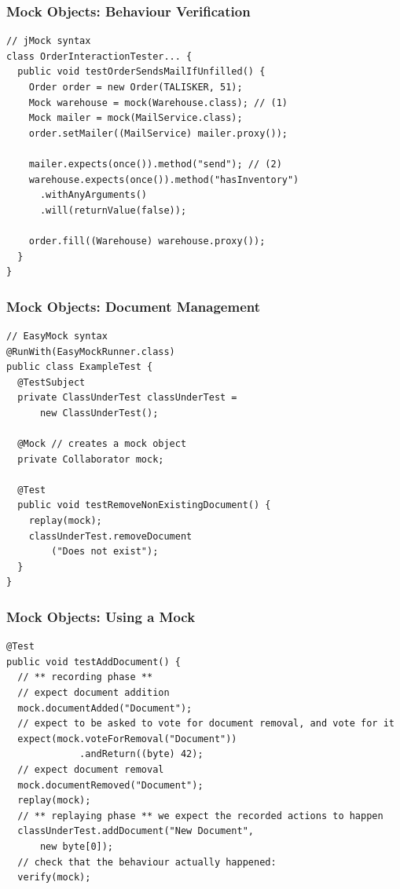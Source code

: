 \documentclass{beamer}
\newenvironment{changemargin}[1]{%
  \begin{list}{}{%
    \setlength{\topsep}{0pt}%
    \setlength{\leftmargin}{#1}%
    \setlength{\rightmargin}{1em}
    \setlength{\listparindent}{\parindent}%
    \setlength{\itemindent}{\parindent}%
    \setlength{\parsep}{\parskip}%
  }%
  \item[]}{\end{list}}
\begin{document}
\begin{frame}[fragile]
  \frametitle{Mock Objects: Behaviour Verification}
  \begin{changemargin}{1cm}
{\small
  \begin{lstlisting}
// jMock syntax
class OrderInteractionTester... {
  public void testOrderSendsMailIfUnfilled() {
    Order order = new Order(TALISKER, 51);
    Mock warehouse = mock(Warehouse.class); // (1)
    Mock mailer = mock(MailService.class);
    order.setMailer((MailService) mailer.proxy());

    mailer.expects(once()).method("send"); // (2)
    warehouse.expects(once()).method("hasInventory")
      .withAnyArguments()
      .will(returnValue(false));

    order.fill((Warehouse) warehouse.proxy());
  }
}    
\end{lstlisting}
}
  \end{changemargin}
\end{frame}

\begin{frame}[fragile]
  \frametitle{Mock Objects: Document Management}
  \begin{changemargin}{1cm}
{\small
  \begin{lstlisting}
// EasyMock syntax
@RunWith(EasyMockRunner.class)
public class ExampleTest {
  @TestSubject
  private ClassUnderTest classUnderTest =
      new ClassUnderTest();

  @Mock // creates a mock object
  private Collaborator mock;

  @Test
  public void testRemoveNonExistingDocument() {
    replay(mock);
    classUnderTest.removeDocument
        ("Does not exist");
  }
} 
\end{lstlisting}
}
  \end{changemargin}
\end{frame}

\begin{frame}[fragile]
  \frametitle{Mock Objects: Using a Mock}
  \begin{changemargin}{1cm}
{\small
  \begin{lstlisting}
@Test
public void testAddDocument() {
  // ** recording phase **
  // expect document addition
  mock.documentAdded("Document");
  // expect to be asked to vote for document removal, and vote for it
  expect(mock.voteForRemoval("Document"))
             .andReturn((byte) 42);
  // expect document removal
  mock.documentRemoved("Document");
  replay(mock);
  // ** replaying phase ** we expect the recorded actions to happen
  classUnderTest.addDocument("New Document",
      new byte[0]);
  // check that the behaviour actually happened:
  verify(mock);
  \end{lstlisting}
}
  \end{changemargin}
\end{frame}
\end{document}
